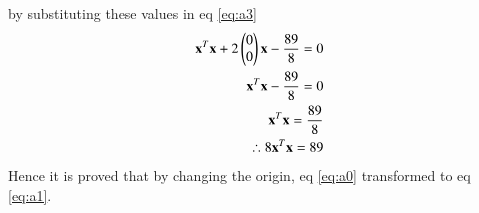 \documentclass[journal,12pt,twocolumn]{IEEEtran}
\begin{document}
by substituting these values in eq \eqref{eq:a3}
\begin{align}
\mathbf{x}^T\mathbf{x}+2\begin{pmatrix}0\\0\end{pmatrix}\mathbf{x}-\frac{89}{8}=0\\
\mathbf{x}^T\mathbf{x}-\frac{89}{8}=0\\
\mathbf{x}^T\mathbf{x} = \frac{89}{8}\\
\therefore 8\mathbf{x}^T\mathbf{x} = 89
\end{align}
Hence it is proved that by changing the origin, eq \eqref{eq:a0} transformed to eq \eqref{eq:a1}.
\end{document}
